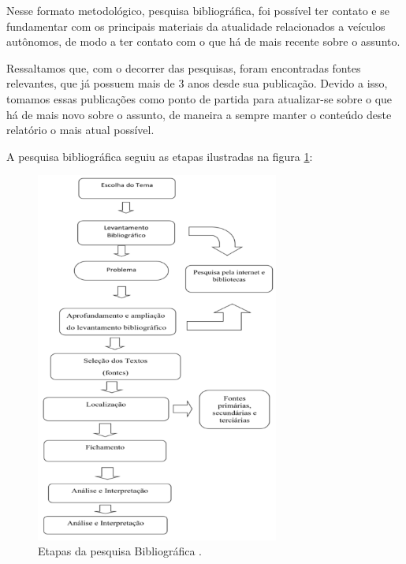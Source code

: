 Nesse formato metodológico, pesquisa bibliográfica, foi possível ter contato e se fundamentar com os principais materiais da atualidade relacionados a veículos autônomos, de modo a ter contato com o que há de mais recente sobre o assunto.

Ressaltamos que, com o decorrer das pesquisas, foram encontradas fontes relevantes, que já possuem mais de 3 anos desde sua publicação. Devido a isso, tomamos essas publicações como ponto de partida para atualizar-se sobre o que há de mais novo sobre o assunto, de maneira a sempre manter o conteúdo deste relatório o mais atual possível.

A pesquisa bibliográfica seguiu as etapas ilustradas na figura \ref{img_bibli}:

\begin{figure}[H]
\centering
\includegraphics[width=8cm]{Figures/bibli.png}
\caption{Etapas da pesquisa Bibliográfica \cite{bibli}.}
\label{img_bibli}
\end{figure}

